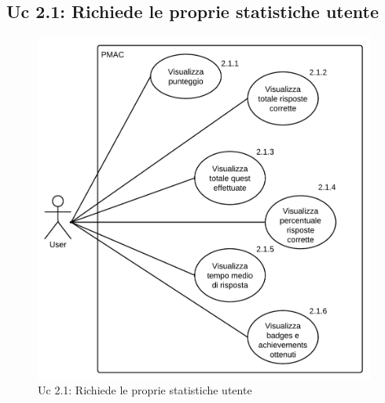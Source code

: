 \documentclass[10pt,a4paper]{article}
\begin{document}
\newpage

\subsection{Uc 2.1: Richiede le proprie statistiche utente}
\begin{figure}[ht]
\centering
\caption{Uc 2.1: Richiede le proprie statistiche utente}
\includegraphics[scale=0.87]{UseCase/Uc2_1} %
\end{figure}
\end{document}
